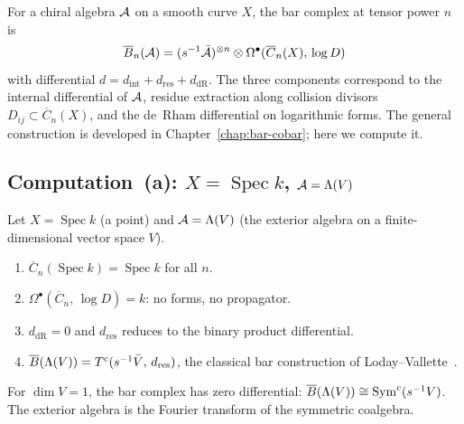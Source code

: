 \begin{definition}
\label{def:fourier-bar-transform}
For a chiral algebra $\mathcal{A}$ on a smooth curve $X$, the bar complex
at tensor power $n$ is
\begin{equation}\label{eq:fourier-bar-transform}
\overline{B}_n(\mathcal{A}) = (s^{-1}\bar{\mathcal{A}})^{\otimes n}
\otimes \Omega^\bullet(\overline{C}_n(X),\, \log D)
\end{equation}
with differential $d = d_{\mathrm{int}} + d_{\mathrm{res}}
+ d_{\mathrm{dR}}$.  The three components correspond to the internal
differential of $\mathcal{A}$, residue extraction along collision divisors
$D_{ij} \subset \overline{C}_n(X)$, and the de~Rham differential on
logarithmic forms.  The general construction is developed in
Chapter~\ref{chap:bar-cobar}; here we compute it.
\end{definition}

\subsection*{Computation~(a): $X = \operatorname{Spec} k$,
  $\mathcal{A} = \Lambda(V)$}

\begin{computation}\label{comp:fourier-point}
Let $X = \operatorname{Spec} k$ (a point) and $\mathcal{A} = \Lambda(V)$
(the exterior algebra on a finite-dimensional vector space $V$).
\begin{enumerate}
\item $\overline{C}_n(\operatorname{Spec} k) = \operatorname{Spec} k$
  for all $n$.
\item $\Omega^\bullet(\overline{C}_n,\, \log D) = k$: no forms, no
  propagator.
\item $d_{\mathrm{dR}} = 0$ and $d_{\mathrm{res}}$ reduces to the
  binary product differential.
\item $\overline{B}(\Lambda(V)) = T^c(s^{-1}\bar{V},\, d_{\mathrm{res}})$,
  the classical bar construction of
  Loday--Vallette~\cite[\S2.2]{LV12}.
\end{enumerate}
\end{computation}

\begin{proposition}[\ClaimStatusProvedHere]
\label{prop:fourier-com-lie-duality}
For $\dim V = 1$, the bar complex has zero differential:
$\overline{B}(\Lambda(V)) \cong \operatorname{Sym}^c(s^{-1}V)$.  The
exterior algebra is the Fourier transform of the symmetric coalgebra.
\end{proposition}

